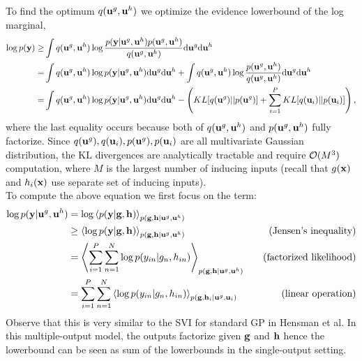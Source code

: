 \documentclass{article} %
\begin{document}
\noindent
To find the optimum $q(\mathbf{u}^g, \mathbf{u}^h)$ we optimize the evidence lowerbound of the log marginal,
\begin{align}
\nonumber
\log p(\mathbf{y}) \ge& \int q(\mathbf{u}^g, \mathbf{u}^h) \log \frac{p(\mathbf{y} | \mathbf{u}^g, \mathbf{u}^h) p(\mathbf{u}^g, \mathbf{u}^h)}{q(\mathbf{u}^g, \mathbf{u}^h)} \mathrm{d} \mathbf{u}^g \mathrm{d} \mathbf{u}^h \\
\nonumber
=& \int q(\mathbf{u}^g, \mathbf{u}^h) \log p(\mathbf{y} | \mathbf{u}^g, \mathbf{u}^h)  \mathrm{d} \mathbf{u}^g \mathrm{d} \mathbf{u}^h 
+ \int q(\mathbf{u}^g, \mathbf{u}^h) \log \frac{p(\mathbf{u}^g, \mathbf{u}^h)}{q(\mathbf{u}^g, \mathbf{u}^h)} \mathrm{d} \mathbf{u}^g \mathrm{d} \mathbf{u}^h \\
\label{eq:elbo}
=& \int q(\mathbf{u}^g, \mathbf{u}^h) \log p(\mathbf{y} | \mathbf{u}^g, \mathbf{u}^h)  \mathrm{d} \mathbf{u}^g \mathrm{d} \mathbf{u}^h 
- \left( KL[q(\mathbf{u}^g) || p(\mathbf{u}^g)] + \sum_{i=1}^P KL[q(\mathbf{u}_i) || p(\mathbf{u}_i)] \right),
\end{align}
where the last equality occurs because both of $q(\mathbf{u}^g, \mathbf{u}^h)$ and $p(\mathbf{u}^g, \mathbf{u}^h)$ fully factorize.
Since $q(\mathbf{u}^g), q(\mathbf{u}_i), p(\mathbf{u}^g), p(\mathbf{u}_i)$ are all multivariate Gaussian distribution, the KL divergences are analytically tractable and require $\mathcal{O}(M^3)$ computation, where $M$ is the largest number of inducing inputs (recall that $g(\mathbf{x})$ and $h_i(\mathbf{x})$ use separate set of inducing inputs). \\

\noindent To compute the above equation we first focus on the term:
\newcommand{\llangle}{\left\langle}
\newcommand{\rrangle}{\right\rangle}
\begin{align}
\nonumber
\log p(\vy | \ug, \uh)
 &= \log \llangle p(\vy | \vg, \vh) \rrangle_{p(\vg,\vh | \ug, \uh)} \\
 \nonumber
&\ge \llangle \log p(\vy | \vg, \vh) \rrangle_{p(\vg,\vh | \ug, \uh)} \quad &\text{(Jensen's inequality)} \\
\nonumber
&=  \llangle \sum_{i=1}^P \sum_{n=1}^N \log p(y_{in} | g_n, h_{in}) \rrangle_{p(\vg,\vh | \ug, \uh)}  \quad &\text{(factorized likelihood)} \\
&= \sum_{i=1}^P \sum_{n=1}^N \llangle \log p(y_{in} | g_n, h_{in}) \rrangle_{p(\vg,\vh_i | \ug, \vu_i)} \quad &\text{(linear operation)}
\end{align}
Observe that this is very similar to the SVI for standard GP in Hensman et al. 
In this multiple-output model, the outputs factorize given $\mathbf{g}$ and $\mathbf{h}$ hence the lowerbound can be seen as sum of the lowerbounds in the single-output setting.
\end{document}
